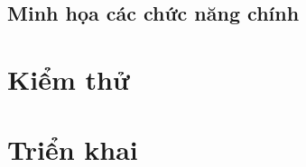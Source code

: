 \subsection*{Minh họa các chức năng chính}
\label{subsec:minhhoa}
\label{sec:caidat-frontend}

\section{Kiểm thử}
\label{sec:kiemthu}
\label{sec:pp-kiemthu}
\label{sec:kq-chucnang}

\BangTestHopDong

\BangTestAPI

\BangDoPhu

\BangGas

\section{Triển khai}
\label{sec:trienkhai}
\label{sec:kq-sepolia}

\HinhTrienKhai



